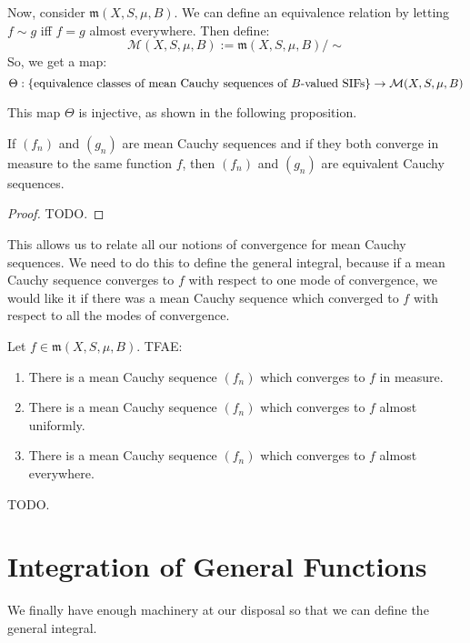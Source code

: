 	 Now, consider $\mathfrak m(X, S, \mu, B)$. We can define an equivalence relation by letting $f\sim g$ iff $f = g$ almost 
	 everywhere. Then define:
	 $$
	 	\mathcal M(X, S, \mu, B) := \mathfrak m(X, S, \mu, B) / \sim
	 $$
	 So, we get a map:
	 $$
	 	\Theta : \{\textnormal{equivalence classes of mean Cauchy sequences of } B \textnormal{-valued SIFs}\}\rightarrow 
		\mathcal M(X, S, \mu, B)
	 $$
	 
	 This map $\Theta$ is injective, as shown in the following proposition.
	 
	 \begin{prop}
	 	If $(f_n)$ and $(g_n)$ are mean Cauchy sequences and if they both converge in measure to the same function $f$, 
		then $(f_n)$ and $(g_n)$ are equivalent Cauchy sequences. 
	 \end{prop}
	 
	 \begin{proof}
		TODO.
	 \end{proof}
	 
	This allows us to relate all our notions of convergence for mean Cauchy sequences. We need to do this to define the 
	general integral, because if a mean Cauchy sequence converges to $f$ with respect to one mode of convergence, we 
	would like it if there was a mean Cauchy sequence which converged to $f$ with respect to all the modes of convergence.
	
	\begin{theorem}
		Let $f\in\mathfrak m(X, S, \mu, B)$. TFAE:
		\begin{enumerate}
			\item There is a mean Cauchy sequence $(f_n)$ which converges to $f$ in measure.
			\item There is a mean Cauchy sequence $(f_n)$ which converges to $f$ almost uniformly.
			\item There is a mean Cauchy sequence $(f_n)$ which converges to $f$ almost everywhere.
		\end{enumerate}
	\end{theorem}
	
	\begin{prop}
		TODO.
	\end{prop}
	
	\section{Integration of General Functions}
	
	We finally have enough machinery at our disposal so that we can define the general integral. 
	
